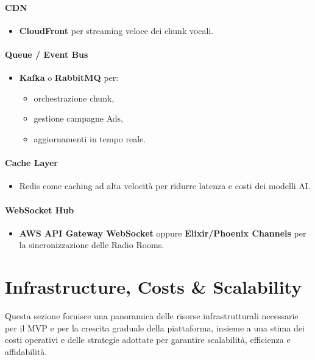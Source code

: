 \documentclass[11pt,a4paper]{article}
\begin{document}
\paragraph{CDN}
\begin{itemize}
    \item \textbf{CloudFront} per streaming veloce dei chunk vocali.
\end{itemize}

\paragraph{Queue / Event Bus}
\begin{itemize}
    \item \textbf{Kafka} o \textbf{RabbitMQ} per:
    \begin{itemize}
        \item orchestrazione chunk,
        \item gestione campagne Ads,
        \item aggiornamenti in tempo reale.
    \end{itemize}
\end{itemize}

\paragraph{Cache Layer}
\begin{itemize}
    \item Redis come caching ad alta velocità per ridurre latenza e costi dei modelli AI.
\end{itemize}

\paragraph{WebSocket Hub}
\begin{itemize}
    \item \textbf{AWS API Gateway WebSocket} oppure \textbf{Elixir/Phoenix Channels} per la sincronizzazione delle Radio Rooms.
\end{itemize}
\section{Infrastructure, Costs \& Scalability}

Questa sezione fornisce una panoramica delle risorse infrastrutturali necessarie per il MVP e per la crescita graduale della piattaforma, insieme a una stima dei costi operativi e delle strategie adottate per garantire scalabilità, efficienza e affidabilità.
\end{document}
